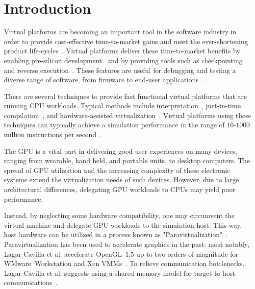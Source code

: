 
\section{Introduction}
\label{sec:introduction}
Virtual platforms are becoming an important tool in the software industry in order to provide cost-effective time-to-market gains and meet the ever-shortening product life-cycles~\cite{journals:magnusson:2002, journals:yi:2006, publications:leupers:2010, publications:aarno:2014}.
Virtual platforms deliver these time-to-market benefits by enabling pre-silicon development~ and by providing tools such as checkpointing and reverse execution~.
These features are useful for debugging and testing a diverse range of software, from firmware to end-user applications~.

There are several techniques to provide fast functional virtual platforms that are running CPU workloads.
Typical methods include interpretation~, just-in-time compilation~, and hardware-assisted virtualization~.
Virtual platforms using these techniques can typically achieve a simulation performance in the range of $10$-$1000$ million instructions per second~.

The GPU is a vital part in delivering good user experiences on many devices, ranging from wearable, hand held, and portable units, to desktop computers.
The spread of GPU utilization and the increasing complexity of these electronic systems extend the virtualization needs of such devices.
However, due to large architectural differences, delegating GPU workloads to CPUs may yield poor performance.

Instead, by neglecting some hardware compatibility, one may circumvent the virtual machine and delegate GPU workloads to the simulation host.
This way, host hardware can be utilized in a process known as "Paravirtualization"~.
Paravirtualization has been used to accelerate graphics in the past; most notably, Lagar-Cavilla et al. accelerate OpenGL~$1.5$ up to two orders of magnitude for WMware~Workstation and Xen VMMs~.
To relieve communication bottlenecks, Lagar-Cavilla et al. suggests using a shared memory model for target-to-host communications~.

